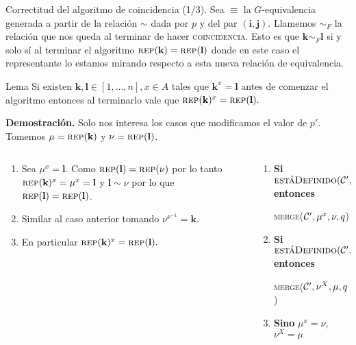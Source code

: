 \documentclass[aspectratio=169, 9pt]{beamer}
\newcommand{\rep}{\textsc{rep}}
\newcommand{\coin}{\textsc{coincidencia}}
\newcommand{\mer}{\textsc{merge}}
\newcommand{\edeff}{\textsc{estáDefinido}}
\newcommand{\Co}{{\cal{C}}}
\begin{document}
\begin{frame}[fragile]{Correctitud del algoritmo de coincidencia (1/3).}
	Sea $\equiv$ la $G$-equivalencia generada a partir de la relación $\sim$ dada por $p$ y del par $(\textbf{i}, \textbf{j})$.
	\pause
	Llamemos $\sim_F$ la relación que nos queda al terminar de hacer \coin.
	Esto es que $\textbf{k} \sim_F \textbf{l}$ si y solo sí al terminar el algoritmo $\rep (\textbf{k}) = \rep(\textbf{l})$ donde en este caso el representante lo estamos mirando respecto a esta nueva relación de equivalencia.
	\pause
	
	\begin{alertblock}{Lema}
		Si existen $\textbf{k}, \textbf{l} \in [1,\dots,n], x \in A$ tales que $\textbf{k}^x = \textbf{l}$ antes de comenzar el algoritmo entonces al terminarlo vale que $\rep(\textbf{k})^x = \rep(\textbf{l}).$
	\end{alertblock}
	\pause
	\textbf{Demostración.} 
	\pause
	Solo nos interesa los casos que modificamos el valor de $p'$. 
	Tomemos $\mu = \rep(\textbf{k}) $ y $\nu = \rep(\textbf{l})$.
	\pause
	\begin{columns}
		\begin{column}{0.5\textwidth}
			\begin{enumerate}
				\item Sea $\mu^x = \textbf{l}$. 
				Como $\rep (\textbf{l}) = \rep (\nu)$ por lo tanto $\rep(\textbf{k})^x = \mu^x = \textbf{l} $ y $\textbf{l} \sim \nu $ por lo que $ \rep(\textbf{l}) = \rep (\textbf{l})$.
				\item Similar al caso anterior tomando $\nu^{x^{-1}} = \textbf{k}$.
				\item En particular $\rep(\textbf{k})^x = \rep(\textbf{l}).$
			\end{enumerate}
		\end{column}
		\begin{column}{0.5\textwidth}  %
			\begin{enumerate}
				\item  \textbf{Si} $\edeff(\Co', \mu, x)$ \textbf{entonces}
				
				 \mer($\Co', \mu^x, \nu, q$) 
				\item  \textbf{Si} $\edeff(\Co', \nu, X)$  \textbf{entonces}
				
				  \mer($\Co', \nu^X, \mu, q$)
				\item \textbf{Sino} $\mu^x = \nu$, $\nu^X = \mu$ 
			\end{enumerate}
		\end{column}
	\end{columns}
\end{frame}
\end{document}
